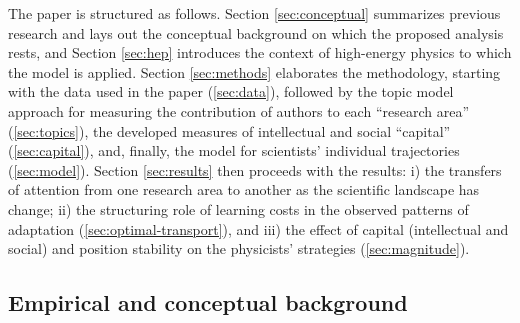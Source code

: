 \documentclass{article}
\begin{document}
The paper is structured as follows. Section \ref{sec:conceptual} summarizes previous research and lays out the conceptual background on which the proposed analysis rests, and Section \ref{sec:hep} introduces the context of high-energy physics to which the model is applied. %
Section \ref{sec:methods} elaborates the methodology, starting with the data used in the paper (\ref{sec:data}), followed by the topic model approach for measuring the contribution of authors to each ``research area'' (\ref{sec:topics}), the developed measures of intellectual and social ``capital'' (\ref{sec:capital}), and, finally, the model for scientists' individual trajectories (\ref{sec:model}).
Section \ref{sec:results} then proceeds with the results: i) the transfers of attention from one research area to another as the scientific landscape has change; ii) the structuring role of learning costs in the observed patterns of adaptation (\ref{sec:optimal-transport}), and iii) the effect of capital (intellectual and social) and position stability on the physicists' strategies (\ref{sec:magnitude}). %


\subsection{\label{sec:conceptual}Empirical and conceptual background}
\end{document}

